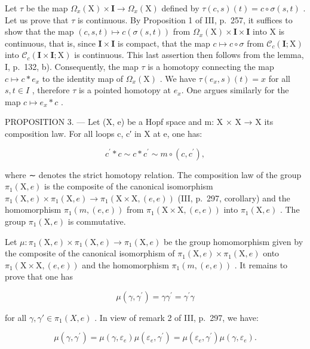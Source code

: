 Let \(\tau\) be the map \(\Omega_x(\mathrm{X}) \times \mathbf{I} \to \Omega_x(\mathrm{X})\) defined by \(\tau(c, s)(t) = c \circ \sigma(s, t)\) . Let us prove that \(\tau\) is continuous. By Proposition 1 of III, p.~257, it suffices to show that the map \((c, s, t) \mapsto c(\sigma(s, t))\) from \(\Omega_x(\mathrm{X}) \times \mathbf{I} \times \mathbf{I}\) into X is continuous, that is, since \(\mathbf{I} \times \mathbf{I}\) is compact, that the map \(c \mapsto c \circ \sigma\) from \(\mathcal{C}_c(\mathbf{I};\mathrm{X})\) into \(\mathcal{C}_c(\mathbf{I} \times \mathbf{I};\mathrm{X})\) is continuous. This last assertion then follows from the lemma, I, p.~132, b). Consequently, the map \(\tau\) is a homotopy connecting the map \(c \mapsto c * e_x\) to the identity map of \(\Omega_x(\mathrm{X})\) . We have \(\tau(e_x, s)(t) = x\) for all \(s, t \in I\) , therefore \(\tau\) is a pointed homotopy at \(e_x\). One argues similarly for the map \(c \mapsto e_x * c\) .

PROPOSITION 3. — Let (X, e) be a Hopf space and m: X × X → X its composition law. For all loops c, c′ in X at e, one has:

\[
c ^ {\prime} * c \sim c * c ^ {\prime} \sim m \circ (c, c ^ {\prime}),
\]

where ∼ denotes the strict homotopy relation. The composition law of the group \(\pi_{1}(\mathrm{X},e)\) is the composite of the canonical isomorphism \(\pi_{1}(\mathrm{X},e)\times\pi_{1}(\mathrm{X},e)\to\pi_{1}(\mathrm{X}\times\mathrm{X},(e,e))\) (III, p.~297, corollary) and the homomorphism \(\pi_{1}(m,(e,e))\) from \(\pi_{1}(\mathrm{X}\times\mathrm{X},(e,e))\) into \(\pi_{1}(\mathrm{X},e)\) . The group \(\pi_{1}(\mathrm{X},e)\) is commutative.

Let \(\mu\colon\pi_{1}(\mathrm{X},e)\times\pi_{1}(\mathrm{X},e)\to\pi_{1}(\mathrm{X},e)\) be the group homomorphism given by the composite of the canonical isomorphism of \(\pi_{1}(\mathrm{X},e)\times\pi_{1}(\mathrm{X},e)\) onto \(\pi_{1}(\mathrm{X}\times\mathrm{X},(e,e))\) and the homomorphism \(\pi_{1}(m,(e,e))\) . It remains to prove that one has

\[
\mu (\gamma , \gamma^ {\prime}) = \gamma \gamma^ {\prime} = \gamma^ {\prime} \gamma\tag{1}
\]

for all \(\gamma, \gamma' \in \pi_1(X, e)\) . In view of remark 2 of III, p.~297, we have:

\[
\mu (\gamma , \gamma^ {\prime}) = \mu (\gamma , \varepsilon_ {e}) \mu (\varepsilon_ {e}, \gamma^ {\prime}) = \mu (\varepsilon_ {e}, \gamma^ {\prime}) \mu (\gamma , \varepsilon_ {e}).\tag{2}
\]

